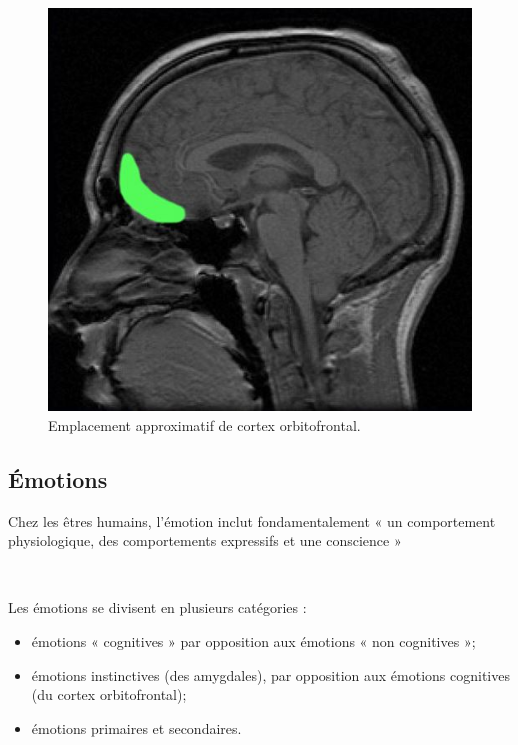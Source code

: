 \begin{figure}[th]
\centering
\includegraphics{Figures/3}
\decoRule
\caption[Cortex Orbifrontal]{Emplacement approximatif de cortex orbitofrontal.}
\label{fig:cortex}
\end{figure}


\subsection{Émotions}

Chez les êtres humains, l'émotion inclut fondamentalement « un comportement physiologique, des comportements expressifs et une conscience » \parencite{myers2004theories}

~\par
Les émotions se divisent en plusieurs catégories :

\begin{itemize}
\item émotions « cognitives » par opposition aux émotions « non cognitives »;
\item émotions instinctives (des amygdales), par opposition aux émotions cognitives (du cortex orbitofrontal);
\item émotions primaires et secondaires.
\end{itemize}

~\par

